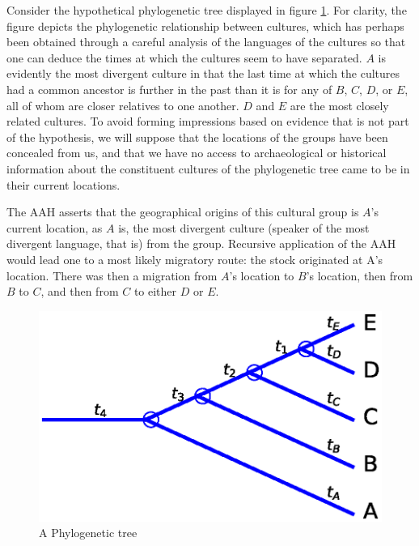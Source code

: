 \documentclass[11pt]{article}
\begin{document}
Consider the hypothetical phylogenetic tree displayed in figure \ref{fig1}. For clarity, the figure depicts the phylogenetic relationship between cultures, which has perhaps been obtained through a careful analysis of the languages of the cultures so that one can deduce the times at which the cultures seem to have separated. $A$ is evidently the most divergent culture in that the last time at which the cultures had a common ancestor is further in the past than it is for any of $B$, $C$, $D$, or $E$, all of whom are closer relatives to one another. $D$ and $E$ are the most closely related cultures. To avoid forming impressions based on evidence that is not part of the hypothesis, we will suppose that the locations of the
groups have been concealed from us, and that we have no access to archaeological or historical information about the constituent cultures of the phylogenetic tree came to be in their current locations.

The AAH asserts that the geographical origins of this cultural group is $A$'s current location, as $A$  is, the most divergent culture (speaker of the most divergent language, that is) from the group. Recursive application of the AAH would lead one to a most likely migratory route: the stock originated at A's location. There was then a migration from $A$'s location to $B$'s location, then from $B$ to $C$, and then from $C$ to either $D$ or $E$.  

\begin{figure}
\begin{center}
\includegraphics[width=\textwidth]{AncillaryFiles//figure1.eps}
\caption{A Phylogenetic tree} \label{fig1}
\end{center} 
\end{figure}
\end{document}
